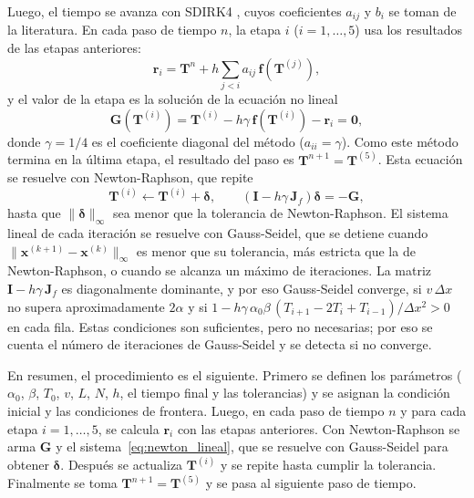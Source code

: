 \documentclass[final,5p,times,twocolumn,authoryear,11pt]{elsarticle}
\begin{document}
Luego, el tiempo se avanza con SDIRK4 \citep{Wang2015, Butcher1996}, cuyos coeficientes $a_{ij}$ y $b_i$ se toman de la literatura. En cada paso de tiempo $n$, la etapa $i$ ($i=1,\dots,5$) usa los resultados de las etapas anteriores:
\begin{equation}
\mathbf{r}_i=\mathbf{T}^n+h\sum_{j<i}a_{ij}\,\mathbf{f}(\mathbf{T}^{(j)}),
\label{eq:ri}
\end{equation}
\noindent y el valor de la etapa es la solución de la ecuación no lineal
\begin{equation}
\mathbf{G}(\mathbf{T}^{(i)}) = \mathbf{T}^{(i)} - h\gamma\,\mathbf{f}(\mathbf{T}^{(i)}) - \mathbf{r}_i = \mathbf{0},
\label{eq:etapa}
\end{equation}
\noindent donde $\gamma = 1/4$ es el coeficiente diagonal del método ($a_{ii}=\gamma$). Como este método termina en la última etapa, el resultado del paso es $\mathbf{T}^{n+1}=\mathbf{T}^{(5)}$. Esta ecuación se resuelve con Newton-Raphson, que repite
\begin{equation}
\mathbf{T}^{(i)} \leftarrow \mathbf{T}^{(i)} + \boldsymbol{\delta}, \qquad
\left(\mathbf{I} - h\gamma\,\mathbf{J}_f\right)\boldsymbol{\delta} = -\mathbf{G},
\label{eq:newton_lineal}
\end{equation}
\noindent hasta que $\|\boldsymbol{\delta}\|_\infty$ sea menor que la tolerancia de Newton-Raphson. El sistema lineal de cada iteración se resuelve con Gauss-Seidel, que se detiene cuando $\|\mathbf{x}^{(k+1)}-\mathbf{x}^{(k)}\|_\infty$ es menor que su tolerancia, más estricta que la de Newton-Raphson, o cuando se alcanza un máximo de iteraciones. La matriz $\mathbf{I} - h\gamma\,\mathbf{J}_f$ es diagonalmente dominante, y por eso Gauss-Seidel converge, si $v\,\Delta x$ no supera aproximadamente $2\alpha$ y si $1-h\gamma\,\alpha_0\beta\,(T_{i+1}-2T_i+T_{i-1})/\Delta x^2>0$ en cada fila. Estas condiciones son suficientes, pero no necesarias; por eso se cuenta el número de iteraciones de Gauss-Seidel y se detecta si no converge.

En resumen, el procedimiento es el siguiente. Primero se definen los parámetros ($\alpha_0$, $\beta$, $T_0$, $v$, $L$, $N$, $h$, el tiempo final y las tolerancias) y se asignan la condición inicial y las condiciones de frontera. Luego, en cada paso de tiempo $n$ y para cada etapa $i=1,\dots,5$, se calcula $\mathbf{r}_i$ con las etapas anteriores. Con Newton-Raphson se arma $\mathbf{G}$ y el sistema~\eqref{eq:newton_lineal}, que se resuelve con Gauss-Seidel para obtener $\boldsymbol{\delta}$. Después se actualiza $\mathbf{T}^{(i)}$ y se repite hasta cumplir la tolerancia. Finalmente se toma $\mathbf{T}^{n+1} = \mathbf{T}^{(5)}$ y se pasa al siguiente paso de tiempo.
\end{document}
